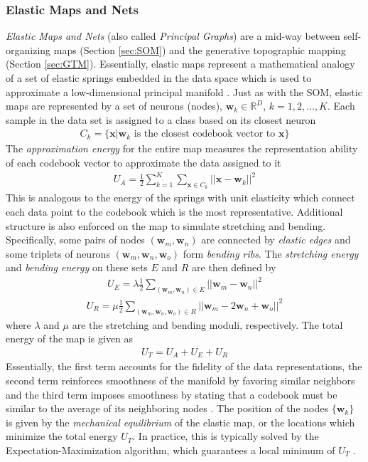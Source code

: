 \subsubsection{Elastic Maps and Nets} \label{sec:Elastic_Maps}
\textit{Elastic Maps and Nets} \citep{Gorban2007ElasticMaps} (also called \textit{Principal Graphs}) are a mid-way between self-organizing maps (Section \ref{sec:SOM}) and the generative topographic mapping (Section \ref{sec:GTM}).   Essentially, elastic maps represent a mathematical analogy of a set of elastic springs embedded in the data space which is used to approximate a low-dimensional principal manifold \citep{Gorban2007ElasticMaps}.  Just as with the SOM, elastic maps are represented by a set of neurons (nodes), $\bm{w}_{k} \in \mathbb{R}^{D}$, $k=1,2,\dots,K$.  Each sample in the data set is assigned to a class based on its closest neuron 
\begin{align}
	C_{k} = \{\bm{x}|\bm{w}_{k} \text{ is the closest codebook vector to } \bm{x} \}
\end{align}
\noindent
The \textit{approximation energy} for the entire map measures the representation ability of each codebook vector to approximate the data assigned to it
\begin{align}
	U_{A} = \frac{1}{2}\sum_{k=1}^{K}\sum_{\bm{x}\in C_{k}} ||\bm{x} - \bm{w}_{k} ||^{2}
\end{align}
\noindent
This is analogous to the energy of the springs with unit elasticity which connect each data point to the codebook which is the most representative.  Additional structure is also enforced on the map to simulate stretching and bending.  Specifically, some pairs of nodes $(\bm{w}_{m}, \bm{w}_{n})$ are connected by \textit{elastic edges} and some triplets of neurons $(\bm{w}_{m}, \bm{w}_{n}, \bm{w}_{o})$ form \textit{bending ribs}.  The \textit{stretching energy} and \textit{bending energy} on these sets $E$ and $R$ are then defined by
\begin{align}
	U_{E} = \lambda \frac{1}{2} \sum_{(\bm{w}_{m}, \bm{w}_{n}) \in E} ||\bm{w}_{m} - \bm{w}_{n} ||^{2}
\end{align}
\begin{align}
	U_{R} = \mu \frac{1}{2} \sum_{(\bm{w}_{m}, \bm{w}_{n}, \bm{w}_{o}) \in R} ||\bm{w}_{m} - 2\bm{w}_{n} + \bm{w}_{o}||^{2}
\end{align}
\noindent
where $\lambda$ and $\mu$ are the stretching and bending moduli, respectively.  The total energy of the map is given as
\begin{align}
	U_{T} = U_{A} + U_{E} + U_{R}
\end{align}
\noindent
Essentially, the first term accounts for the fidelity of the data representations, the second term reinforces smoothness of the manifold by favoring similar neighbors and the third term imposes smoothness by stating that a codebook must be similar to the average of its neighboring nodes \citep{Sorzano2014DRReview}.  The position of the nodes $\{\bm{w}_{k}\}$ is given by the \textit{mechanical equilibrium} of the elastic map, or the locations which minimize the total energy $U_{T}$.  In practice, this is typically solved by the Expectation-Maximization algorithm, which guarantees a local minimum of $U_{T}$ \citep{Gorban2007ElasticMaps}.

